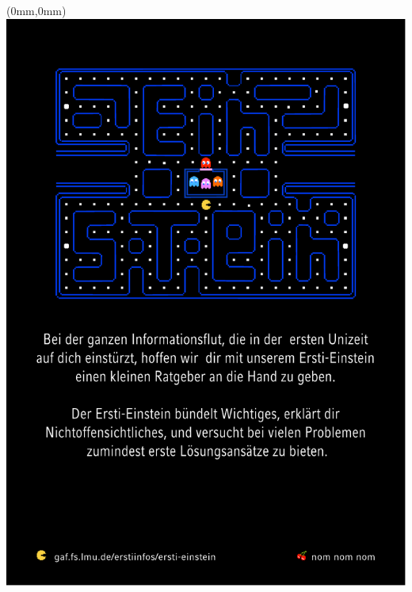 \documentclass[twoside,a5paper,fontsize=9pt]{scrartcl}
\begin{document}
\thispagestyle{empty}
\begin{textblock*}{\paperwidth}(0mm,0mm)
   \noindent\includegraphics[width=\paperwidth,height=\paperheight]{back}
\end{textblock*}
\mbox{}
\end{document}
